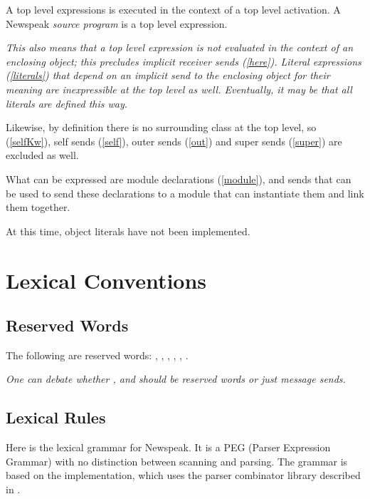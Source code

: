 \documentclass{article}
\begin{document}
A top level expressions is executed in the context of a top level activation. A Newspeak {\em source program} is a top level expression.
{\it
This also means that a top level expression is not evaluated in the context of an enclosing object; this precludes implicit receiver sends (\ref{here}).  Literal expressions (\ref{literals}) that depend on an implicit send to the enclosing object for their meaning are inexpressible at the top level as well. Eventually, it may be that all literals are defined this way.

Likewise, by definition there is no surrounding class at the top level, so \SELF{} (\ref{selfKw}), self sends (\ref{self}), outer sends (\ref{out}) and super sends (\ref{super}) are excluded as well.

What can be expressed are module declarations (\ref{module}), and sends that can be used to send these declarations to a module that can instantiate them and link them together.

At this time, object literals have not been implemented. 
}

 


\section{Lexical Conventions}
\label{lex}

\subsection{Reserved Words}
\label{reserved}
 
The following  are reserved words: \SELF, \SUPER, \OUTER, \TRUE, \FALSE, \NIL.

{\it 
One can debate whether \TRUE, \FALSE{} and \NIL{} should be reserved words or just message sends. 
}


\subsection{Lexical Rules}
\label{lexrules}

Here is the lexical grammar for Newspeak. It is a PEG (Parser Expression Grammar) with no distinction between scanning and parsing. The grammar is based on the implementation, which uses the parser combinator library described in \cite{bracha07a}.
\end{document}
